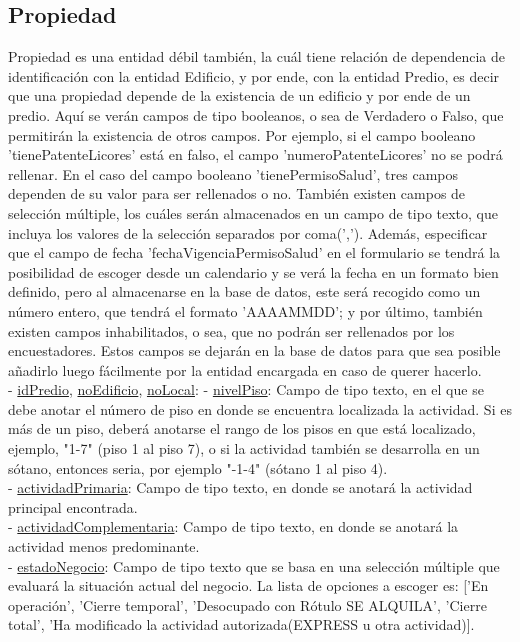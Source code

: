 \subsection{Propiedad}
Propiedad es una entidad débil también, la cuál tiene relación de dependencia de identificación con la entidad Edificio, y por ende, con la entidad Predio, es decir que una propiedad depende de la existencia de un edificio y por ende de un predio.
Aquí se verán campos de tipo booleanos, o sea de Verdadero o Falso, que permitirán la existencia de otros campos. Por ejemplo, si el campo booleano 'tienePatenteLicores' está en falso, el campo 'numeroPatenteLicores' no se podrá rellenar. En el
caso del campo booleano 'tienePermisoSalud', tres campos dependen de su valor para ser rellenados o no. También existen campos de selección múltiple, los cuáles serán almacenados en un campo de tipo texto, que incluya los valores de la selección
separados por coma(','). Además, especificar que el campo de fecha 'fechaVigenciaPermisoSalud' en el formulario se tendrá la posibilidad de escoger desde un calendario y se verá la fecha en un formato bien definido, pero al almacenarse en la
base de datos, este será recogido como un número entero, que tendrá el formato 'AAAAMMDD'; y por último, también existen campos inhabilitados, o sea, que no podrán ser rellenados por los encuestadores. Estos campos se dejarán en la base de datos
para que sea posible añadirlo luego fácilmente por la entidad encargada en caso de querer hacerlo. \\
- \underline{idPredio}, \underline{noEdificio}, \underline{noLocal}:
- \underline{nivelPiso}:  Campo de tipo texto, en el que se debe anotar el número de piso en donde se encuentra localizada la actividad. Si es más de un piso, deberá anotarse el
rango de los pisos en que está localizado, ejemplo, "1-7" (piso 1 al piso 7), o si la actividad también se desarrolla en un sótano, entonces seria, por ejemplo "$ $-1-4" (sótano 1 al piso 4). \\
- \underline{actividadPrimaria}: Campo de tipo texto, en donde se anotará la actividad principal encontrada. \\
- \underline{actividadComplementaria}:  Campo de tipo texto, en donde se anotará la actividad menos predominante.\\
- \underline{estadoNegocio}: Campo de tipo texto que se basa en una selección múltiple que evaluará la situación actual del negocio. La lista de opciones a escoger es: ['En operación', 'Cierre temporal', 'Desocupado con Rótulo SE ALQUILA', 'Cierre total', 'Ha modificado la actividad autorizada(EXPRESS u otra actividad)].\\
